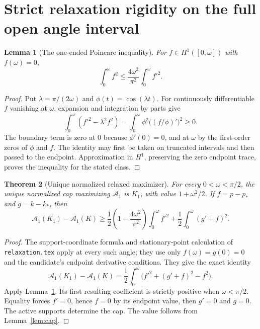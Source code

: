 \documentclass[11pt]{article}
\newtheorem{theorem}{Theorem}[section]
\newtheorem{lemma}[theorem]{Lemma}
\begin{document}
\section{Strict relaxation rigidity on the full open angle interval}
\begin{lemma}[The one-ended Poincare inequality]\label{lem:poincare}
For $f\in H^1([0,\omega])$ with $f(\omega)=0$,
\[
 \int_0^\omega f^2\le\frac{4\omega^2}{\pi^2}\int_0^\omega f'^2.
\]
\end{lemma}
\begin{proof}
Put $\lambda=\pi/(2\omega)$ and $\phi(t)=\cos(\lambda t)$. For continuously differentiable $f$ vanishing at $\omega$, expansion and integration by parts give
\[
 \int_0^\omega(f'^2-\lambda^2f^2)
 =\int_0^\omega\phi^2\bigl((f/\phi)'\bigr)^2\ge0.
\]
The boundary term is zero at $0$ because $\phi'(0)=0$, and at $\omega$ by the first-order zeros of $\phi$ and $f$. The identity may first be taken on truncated intervals and then passed to the endpoint. Approximation in $H^1$, preserving the zero endpoint trace, proves the inequality for the stated class.
\end{proof}

\begin{theorem}[Unique normalized relaxed maximizer]\label{thm:relaxation}
For every $0<\omega<\pi/2$, the unique normalized cap maximizing $\mathcal A_1$ is $K_1$, with value $1+\omega^2/2$. If $f=p-p_*$ and $g=k-k_*$, then
\[
 \mathcal A_1(K_1)-\mathcal A_1(K)
 \ge\frac12\left(1-\frac{4\omega^2}{\pi^2}\right)\int_0^\omega f'^2
       +\frac12\int_0^\omega(g'+f)^2.
\]
\end{theorem}
\begin{proof}
The support-coordinate formula and stationary-point calculation of \texttt{relaxation.tex} apply at every such angle; they use only $f(\omega)=g(0)=0$ and the candidate's endpoint derivative conditions. They give the exact identity
\[
 \mathcal A_1(K_1)-\mathcal A_1(K)
 =\frac12\int_0^\omega\bigl(f'^2+(g'+f)^2-f^2\bigr).
\]
Apply Lemma~\ref{lem:poincare}. Its first resulting coefficient is strictly positive when $\omega<\pi/2$. Equality forces $f'=0$, hence $f=0$ by its endpoint value, then $g'=0$ and $g=0$. The active supports determine the cap. The value follows from Lemma~\ref{lem:cap}.
\end{proof}
\end{document}
